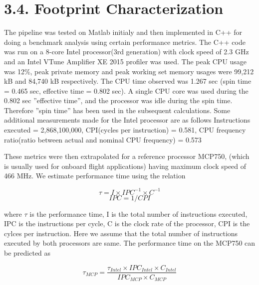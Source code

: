 \documentclass{article}
\title{}
\author{}
\date{\vspace{-5ex}}
\begin{document}
	\maketitle
	
	\section*{3.4. Footprint Characterization}
	The pipeline was tested on Matlab initialy and then implemented in C++ for doing a benchmark analysis using certain performance metrics. The C++ code was run on a 8-core Intel processor(3rd generation) with clock speed of 2.3 GHz and an Intel VTune Amplifier XE 2015 profiler was used. The peak CPU usage was 12\%, peak private memory and peak working set memory usages were 99,212 kB and 84,740 kB respectively. The CPU time observed was 1.267 sec (spin time = 0.465 sec, effective time = 0.802 sec). A single CPU core was used during the 0.802 sec ''effective time'', and the processor was idle during the spin time. Therefore ''spin time'' has been used in the subsequent calculations. Some additional measurements made for the Intel processor are as follows
	Instructions executed = 2,868,100,000, 
	CPI(cycles per instruction) = 0.581, 
	CPU frequency ratio(ratio between actual and nominal CPU frequency) = 0.573\newline
	
	These metrics were then extrapolated for a reference processor MCP750, (which is usually used for onboard flight applications) having maximum clock speed of 466 MHz. We estimate performance time using the relation
	
	\begin{equation}
	\tau = I\times IPC^{-1}\times C^{-1}
	\end{equation}
	\begin{equation}
	IPC = 1/CPI
	\end{equation}
	
	where $\tau$ is the performance time, I is the total number of instructions executed, IPC is the instructions per cycle, C is the clock rate of the processor, CPI is the cylces per instruction.
	Here we assume that the total number of instructions executed by both processors are same. The performance time on the MCP750 can be predicted as
	
	\begin{equation}
	\tau_{MCP}=\frac{\tau_{Intel} \times IPC_{Intel} \times C_{Intel} }{IPC_{MCP} \times C_{MCP}}
	\end{equation}
	
\end{document}
